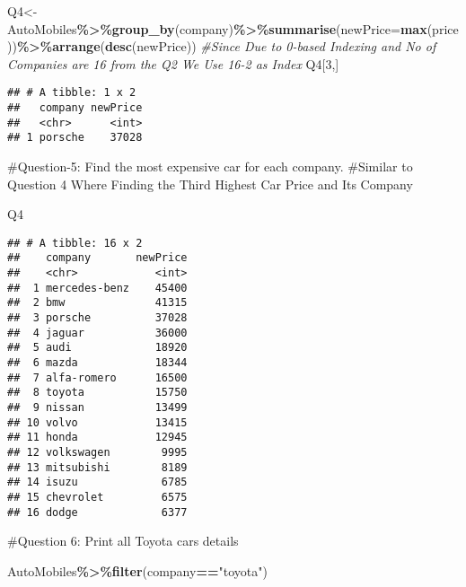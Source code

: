 \documentclass[
]{article}
\newenvironment{Shaded}{\begin{snugshade}}{\end{snugshade}}
\newcommand{\AttributeTok}[1]{\textcolor[rgb]{0.13,0.29,0.53}{#1}}
\newcommand{\CommentTok}[1]{\textcolor[rgb]{0.56,0.35,0.01}{\textit{#1}}}
\newcommand{\DecValTok}[1]{\textcolor[rgb]{0.00,0.00,0.81}{#1}}
\newcommand{\FunctionTok}[1]{\textcolor[rgb]{0.13,0.29,0.53}{\textbf{#1}}}
\newcommand{\NormalTok}[1]{#1}
\newcommand{\OtherTok}[1]{\textcolor[rgb]{0.56,0.35,0.01}{#1}}
\newcommand{\SpecialCharTok}[1]{\textcolor[rgb]{0.81,0.36,0.00}{\textbf{#1}}}
\newcommand{\StringTok}[1]{\textcolor[rgb]{0.31,0.60,0.02}{#1}}
\begin{document}
\begin{Shaded}
\begin{Highlighting}[]
\NormalTok{Q4}\OtherTok{\textless{}{-}}\NormalTok{AutoMobiles}\SpecialCharTok{\%\textgreater{}\%}\FunctionTok{group\_by}\NormalTok{(company)}\SpecialCharTok{\%\textgreater{}\%}\FunctionTok{summarise}\NormalTok{(}\AttributeTok{newPrice=}\FunctionTok{max}\NormalTok{(price))}\SpecialCharTok{\%\textgreater{}\%}\FunctionTok{arrange}\NormalTok{(}\FunctionTok{desc}\NormalTok{(newPrice))}
\CommentTok{\#Since Due to 0{-}based Indexing and No of Companies are 16 from the Q2 We Use 16{-}2 as Index}
\NormalTok{Q4[}\DecValTok{3}\NormalTok{,]}
\end{Highlighting}
\end{Shaded}

\begin{verbatim}
## # A tibble: 1 x 2
##   company newPrice
##   <chr>      <int>
## 1 porsche    37028
\end{verbatim}

\#Question-5: Find the most expensive car for each company. \#Similar to
Question 4 Where Finding the Third Highest Car Price and Its Company

\begin{Shaded}
\begin{Highlighting}[]
\NormalTok{Q4}
\end{Highlighting}
\end{Shaded}

\begin{verbatim}
## # A tibble: 16 x 2
##    company       newPrice
##    <chr>            <int>
##  1 mercedes-benz    45400
##  2 bmw              41315
##  3 porsche          37028
##  4 jaguar           36000
##  5 audi             18920
##  6 mazda            18344
##  7 alfa-romero      16500
##  8 toyota           15750
##  9 nissan           13499
## 10 volvo            13415
## 11 honda            12945
## 12 volkswagen        9995
## 13 mitsubishi        8189
## 14 isuzu             6785
## 15 chevrolet         6575
## 16 dodge             6377
\end{verbatim}

\#Question 6: Print all Toyota cars details

\begin{Shaded}
\begin{Highlighting}[]
\NormalTok{AutoMobiles}\SpecialCharTok{\%\textgreater{}\%}\FunctionTok{filter}\NormalTok{(company}\SpecialCharTok{==}\StringTok{"toyota"}\NormalTok{)}
\end{Highlighting}
\end{Shaded}
\end{document}

